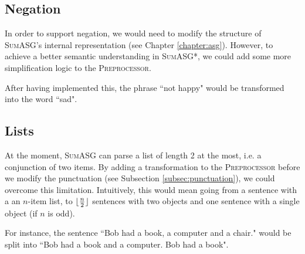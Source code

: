 \subsection{Negation}

In order to support negation, we would need to modify the structure of \textsc{SumASG}'s internal representation (see Chapter \ref{chapter:asg}). However, to achieve a better semantic understanding in \textsc{SumASG*}, we could add some more simplification logic to the \textsc{Preprocessor}.

After having implemented this, the phrase ``not happy" would be transformed into the word ``sad".

\subsection{Lists}

At the moment, \textsc{SumASG} can parse a list of length 2 at the most, i.e. a conjunction of two items. By adding a transformation to the \textsc{Preprocessor} before we modify the punctuation (see Subsection \ref{subsec:punctuation}), we could overcome this limitation. Intuitively, this would mean going from a sentence with a an $n$-item list, to $\lfloor \frac{n}{2} \rfloor$ sentences with two objects and one sentence with a single object (if $n$ is odd).

For instance, the sentence ``Bob had a book, a computer and a chair." would be split into ``Bob had a book and a computer. Bob had a book".